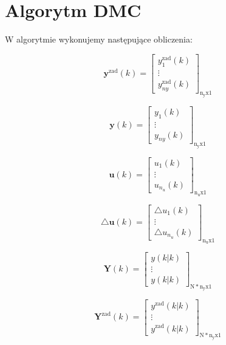 \section{Algorytm DMC}
W algorytmie wykonujemy następujące obliczenia: 

\begin{equation}
\boldsymbol{y}^{\mathrm{zad}}(k)=\left[
\begin{array}{c}
y^{\mathrm{zad}}_1(k)\\
\vdots\\
y^{\mathrm{zad}}_{ny}(k)
\end{array}
\right]_{\mathrm{n_yx1}}
\label{yzadm}
\end{equation}

\begin{equation}
\boldsymbol{y}(k)=\left[
\begin{array}{c}
y_1(k)\\
\vdots\\
y_{ny}(k)
\end{array}
\right]_{\mathrm{n_yx1}}
\label{ym}
\end{equation}

\begin{equation}
\boldsymbol{u}(k)=\left[
\begin{array}{c}
u_1(k)\\
\vdots\\
u_{n_u}(k)
\end{array}
\right]_{\mathrm{n_ux1}}
\label{Um}
\end{equation}

\begin{equation}
\triangle\boldsymbol{u}(k)=\left[
\begin{array}{c}
\triangle u_1(k)\\
\vdots\\
\triangle u_{n_u}(k)
\end{array}
\right]_{\mathrm{n_ux1}}
\label{dUm}
\end{equation}

\begin{equation}
\boldsymbol{Y}(k)=\left[
\begin{array}{c}
y(k|k)\\
\vdots\\
y(k|k)
\end{array}
\right]_{\mathrm{N*n_yx1}}
\label{Y}
\end{equation}

\begin{equation}
\boldsymbol{Y}^{\mathrm{zad}}(k)=\left[
\begin{array}{c}
y^{\mathrm{zad}}(k|k)\\
\vdots\\
y^{\mathrm{zad}}(k|k)
\end{array}
\right]_{\mathrm{N*n_yx1}}
\label{Yzad}
\end{equation}

